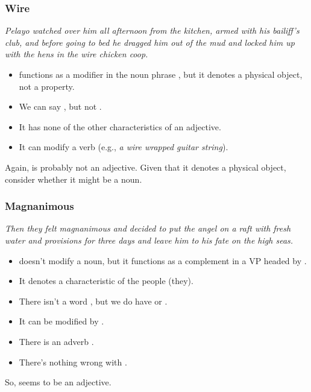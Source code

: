 \subsubsection*{Wire}
\textit{Pelayo watched over him all afternoon from the kitchen, armed with his bailiff's club, and before going to bed he dragged him out of the mud and locked him up with the hens in the \emph{wire} chicken coop.}

\begin{itemize}[noitemsep]
    \item {} functions as a modifier in the noun phrase , but it denotes a physical object, not a property.
    \item We can say , but not .
    \item It has none of the other characteristics of an adjective.
    \item It can modify a verb (e.g., \textit{a \emph{wire wrapped} guitar string}).
\end{itemize}
Again,  is probably not an adjective. Given that it denotes a physical object, consider whether it might be a noun.

\subsubsection*{Magnanimous}
\textit{Then they felt \emph{magnanimous} and decided to put the angel on a raft with fresh water and provisions for three days and leave him to his fate on the high seas.}

\begin{itemize}[noitemsep]
    \item {} doesn't modify a noun, but it functions as a complement in a VP headed by .
    \item It denotes a characteristic of the people (they).
    \item There isn't a word , but we do have  or .
    \item It can be modified by .
    \item There is an adverb .
    \item There's nothing wrong with .
\end{itemize}
So,  seems to be an adjective.

